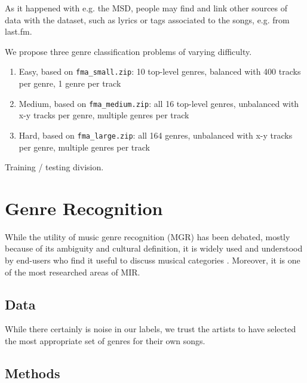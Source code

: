 \documentclass{article}
\begin{document}
As it happened with e.g. the MSD, people may find and link other sources of data with the dataset, such as lyrics or tags associated to the songs, e.g. from last.fm.

We propose three genre classification problems of varying difficulty.

\begin{enumerate}
	\item Easy, based on \texttt{fma\_small.zip}: 10 top-level genres, balanced with 400 tracks per genre, 1 genre per track
	\item Medium, based on \texttt{fma\_medium.zip}: all 16 top-level genres, unbalanced with x-y tracks per genre, multiple genres per track
	\item Hard, based on \texttt{fma\_large.zip}: all 164 genres, unbalanced with x-y tracks per genre, multiple genres per track
\end{enumerate}

Training / testing division.


\section{Genre Recognition} %



While the utility of music genre recognition (MGR) has been debated, mostly because of its ambiguity and cultural definition, it is widely used and understood by end-users who find it useful to discuss musical categories \cite{mgr_why}. Moreover, it is one of the most researched areas of MIR.

\subsection{Data}

While there certainly is noise in our labels, we trust the artists to have selected the most appropriate set of genres for their own songs.

\subsection{Methods}
\end{document}
